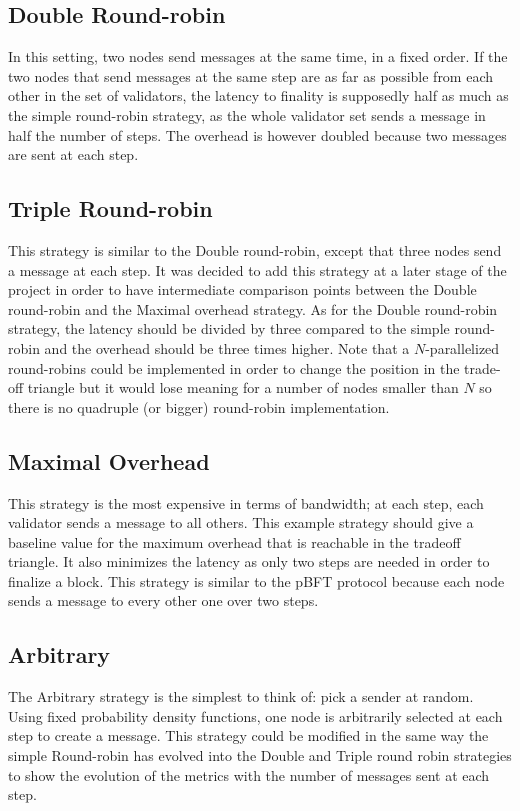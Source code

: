 \subsection{Double Round-robin}
In this setting, two nodes send messages at the same time, in a fixed order. If
the two nodes that send messages at the same step are as far as possible from each
other in the set of validators, the latency to finality is supposedly
half as much as the simple round-robin strategy, as the whole validator set
sends a message in half the number of steps. The overhead is however
doubled because two messages are sent at each step.

\subsection{Triple Round-robin}
This strategy is similar to the Double round-robin, except that three nodes send
a message at each step. It was decided to add this strategy at a later stage of
the project in order to have intermediate comparison points between the Double
round-robin and the Maximal overhead strategy. As for the Double round-robin
strategy, the latency should be divided by three compared to the simple
round-robin and the overhead should be three times higher.
Note that a \(N\)-parallelized round-robins could be implemented in order to change the
position in the trade-off triangle but it would lose meaning for a number of
nodes smaller than \(N\) so there is no quadruple (or bigger) round-robin
implementation.

\subsection{Maximal Overhead}
This strategy is the most expensive in terms of bandwidth; at each step, each
validator sends a message to all others. This example strategy should give a
baseline value for the maximum overhead that is reachable in the tradeoff
triangle. It also minimizes the latency as only two steps are needed in order to
finalize a block. This strategy is similar to the pBFT\cite{pBFT} protocol
because each node sends a message to every other one over two steps.

\subsection{Arbitrary}
The Arbitrary strategy is the simplest to think of: pick a sender at random.
Using fixed probability density functions, one node is arbitrarily selected at
each step to create a message. This strategy could be modified in the same way
the simple Round-robin has evolved into the Double and Triple round robin
strategies to show the evolution of the metrics with the number of messages sent
at each step.

